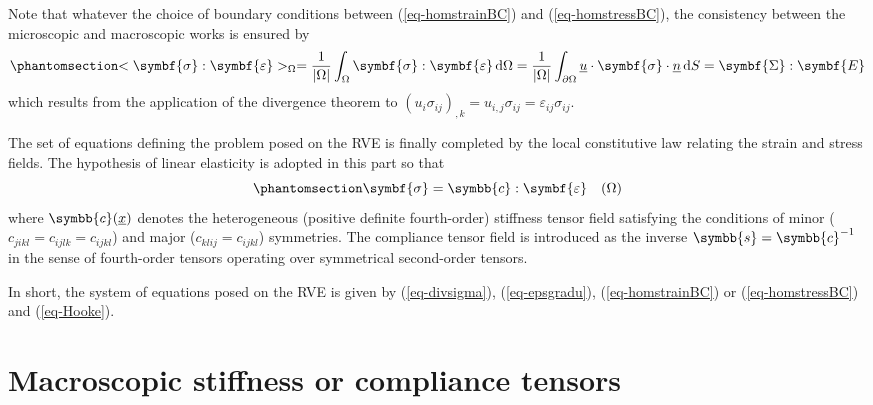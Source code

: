 \documentclass[
  a4paper,
  numbers=noendperiod,
  DIV=12]{scrreprt}
\newcommand{\uu}[1]{{\symbf{{#1}}}}
\newcommand{\uuuu}[1]{{\symbb{{#1}}}}
\newcommand{\uv}[1]{{\underline{{#1}}}}
\newcommand{\x}{{\uv{{x}}}}
\newcommand{\n}{{\uv{{n}}}}
\newcommand{\eps}{{\uu{{\varepsilon}}}}
\newcommand{\E}{{\uu{{E}}}}
\newcommand{\sig}{{\uu{{\sigma}}}}
\newcommand{\Sig}{{\uu{{\Sigma}}}}
\newcommand{\ud}{{\,\mathrm{d}}}
\begin{document}
\begin{tcolorbox}[enhanced jigsaw, title=\textcolor{quarto-callout-note-color}{\faInfo}\hspace{0.5em}{Hill lemma}, left=2mm, titlerule=0mm, colback=white, breakable, colframe=quarto-callout-note-color-frame, bottomtitle=1mm, toptitle=1mm, rightrule=.15mm, bottomrule=.15mm, coltitle=black, opacitybacktitle=0.6, arc=.35mm, colbacktitle=quarto-callout-note-color!10!white, leftrule=.75mm, opacityback=0, toprule=.15mm]

Note that whatever the choice of boundary conditions between
(\ref{eq-homstrainBC}) and (\ref{eq-homstressBC}), the consistency
between the microscopic and macroscopic works is ensured by
\begin{equation}\phantomsection\label{eq-Hilllemma}{
<\sig:\eps>_{\Omega}
=\frac{1}{\lvert \Omega \rvert}\int_\Omega \sig:\eps\ud \Omega
=\frac{1}{\lvert \Omega \rvert}\int_{\partial\Omega} \uv{u}\cdot\sig\cdot\n \ud S
=\Sig:\E
}\end{equation} which results from the application of the divergence
theorem to
\((u_i\sigma_{ij})_{,k}=u_{i,j}\sigma_{ij}=\varepsilon_{ij}\sigma_{ij}\).

\end{tcolorbox}

The set of equations defining the problem posed on the RVE is finally
completed by the local constitutive law relating the strain and stress
fields. The hypothesis of linear elasticity is adopted in this part so
that \begin{equation}\phantomsection\label{eq-Hooke}{
\sig=\uuuu{c}:\eps \quad(\Omega)
}\end{equation} where \(\uuuu{c}(\x)\) denotes the heterogeneous
(positive definite fourth-order) stiffness tensor field satisfying the
conditions of minor (\(c_{jikl}=c_{ijlk}=c_{ijkl}\)) and major
(\(c_{klij}=c_{ijkl}\)) symmetries. The compliance tensor field is
introduced as the inverse \(\uuuu{s}=\uuuu{c}^{-1}\) in the sense of
fourth-order tensors operating over symmetrical second-order tensors.

In short, the system of equations posed on the RVE is given by
(\ref{eq-divsigma}), (\ref{eq-epsgradu}), (\ref{eq-homstrainBC}) or
(\ref{eq-homstressBC}) and (\ref{eq-Hooke}).

\section{Macroscopic stiffness or compliance
tensors}\label{sec-basics_elas_mac_stiff}
\end{document}
